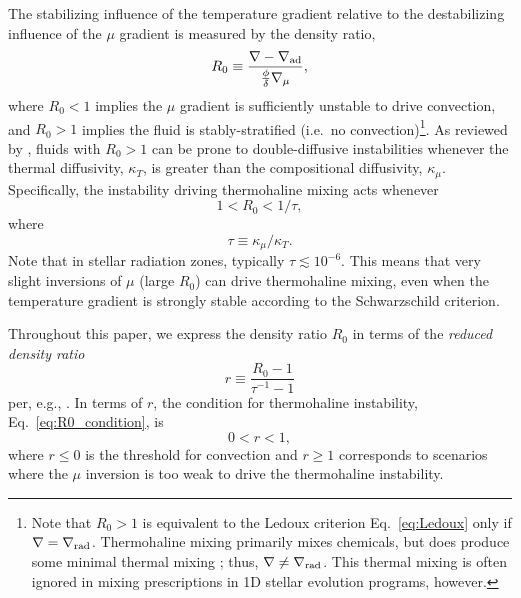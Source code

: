 The stabilizing influence of the temperature gradient relative to the destabilizing influence of the $\mu$ gradient is measured by the density ratio,
\begin{equation} \label{eq:R0}
    R_0 \equiv \frac{\grad - \gradad}{\frac{\phi}{\delta} \gradmu},
\end{equation}
where $R_0 < 1$ implies the $\mu$ gradient is sufficiently unstable to drive convection, and $R_0 > 1$ implies the fluid is stably-stratified (i.e.~no convection)\footnote{Note that $R_0>1$ is equivalent to the Ledoux criterion Eq.~\eqref{eq:Ledoux} only if $\nabla = \nabla_{\rm{rad}}$. Thermohaline mixing primarily mixes chemicals, but does produce some minimal thermal mixing \citep[see, e.g., Fig.~4 of][]{brown_etal_2013}; thus, $\nabla \neq \nabla_{\rm{rad}}$. This thermal mixing is often ignored in mixing prescriptions in 1D stellar evolution programs, however.}. 
As reviewed by \citet{garaud_DDC_review_2018}, fluids with $R_0 > 1$ can be prone to double-diffusive instabilities whenever the thermal diffusivity, $\kappa_T$, is greater than the compositional diffusivity, $\kappa_\mu$. Specifically, the instability driving thermohaline mixing acts whenever
\begin{equation} \label{eq:R0_condition}
1 < R_0 < 1/\tau,
\end{equation}
\citep{baines_gill_1969} where
\begin{equation} \label{eq:tau}
    \tau \equiv \kappa_\mu/\kappa_T.
\end{equation}
Note that in stellar radiation zones, typically $\tau \lesssim 10^{-6}$. This means that very slight inversions of $\mu$ (large $R_0$) can drive thermohaline mixing, even when the temperature gradient is strongly stable according to the Schwarzschild criterion. 

Throughout this paper, we express the density ratio $R_0$ in terms of the \textit{reduced density ratio}
\begin{equation} \label{eq:r}
    r \equiv \frac{R_0 - 1}{\tau^{-1} - 1}
\end{equation}
per, e.g., \citet{traxler_etal_2011,brown_etal_2013}.
In terms of $r$, the condition for thermohaline instability, Eq.~\eqref{eq:R0_condition}, is
\begin{equation} \label{eq:r_condition}
    0 < r < 1,
\end{equation}
where $r \leq 0$ is the threshold for convection and $r \geq 1$ corresponds to scenarios where the $\mu$ inversion is too weak to drive the thermohaline instability.